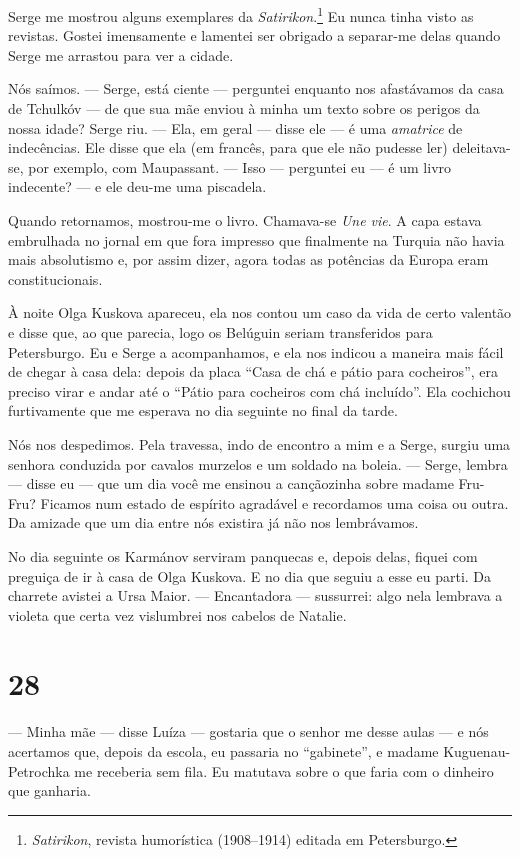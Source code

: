 Serge me mostrou alguns exemplares da \emph{Satirikon}.\footnote{\emph{Satirikon},
  revista humorística (1908--1914) editada em Petersburgo.} Eu nunca
tinha visto as revistas. Gostei imensamente e lamentei ser obrigado a
separar-me delas quando Serge me arrastou para ver a cidade.

Nós saímos. --- Serge, está ciente --- perguntei enquanto nos
afastávamos da casa de Tchulkóv --- de que sua mãe enviou à minha um
texto sobre os perigos da nossa idade? Serge riu. --- Ela, em geral ---
disse ele --- é uma \emph{amatrice} de indecências. Ele disse que ela
(em francês, para que ele não pudesse ler) deleitava-se, por exemplo,
com Maupassant. --- Isso --- perguntei eu --- é um livro indecente? ---
e ele deu-me uma piscadela.

Quando retornamos, mostrou-me o livro. Chamava-se \emph{Une vie}. A capa
estava embrulhada no jornal em que fora impresso que finalmente na
Turquia não havia mais absolutismo e, por assim dizer, agora todas as
potências da Europa eram constitucionais.

À noite Olga Kuskova apareceu, ela nos contou um caso da vida de certo
valentão e disse que, ao que parecia, logo os Belúguin seriam
transferidos para Petersburgo. Eu e Serge a acompanhamos, e ela nos
indicou a maneira mais fácil de chegar à casa dela: depois da placa
``Casa de chá e pátio para cocheiros'', era preciso virar e andar até o
``Pátio para cocheiros com chá incluído''. Ela cochichou furtivamente
que me esperava no dia seguinte no final da tarde.

Nós nos despedimos. Pela travessa, indo de encontro a mim e a Serge,
surgiu uma senhora conduzida por cavalos murzelos e um soldado na
boleia. --- Serge, lembra --- disse eu --- que um dia você me ensinou a
cançãozinha sobre madame Fru-Fru? Ficamos num estado de espírito
agradável e recordamos uma coisa ou outra. Da amizade que um dia entre
nós existira já não nos lembrávamos.

No dia seguinte os Karmánov serviram panquecas e, depois delas, fiquei
com preguiça de ir à casa de Olga Kuskova. E no dia que seguiu a esse eu
parti. Da charrete avistei a Ursa Maior. --- Encantadora --- sussurrei:
algo nela lembrava a violeta que certa vez vislumbrei nos cabelos de
Natalie.

\section{28}

--- Minha mãe --- disse Luíza --- gostaria que o senhor me desse aulas
--- e nós acertamos que, depois da escola, eu passaria no ``gabinete'',
e madame Kuguenau- Petrochka me receberia sem fila. Eu matutava sobre o
que faria com o dinheiro que ganharia.

